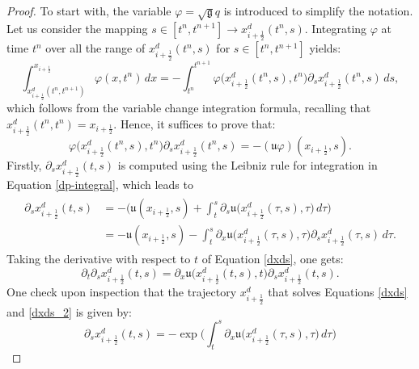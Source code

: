 \documentclass[preprint,12pt]{elsarticle}
\begin{document}
\begin{linenumbers}
\begin{proof}
To start with, the variable $\varphi = \sqrt{\mathfrak{g}}q$ is introduced to simplify the notation.
Let us consider the mapping $s\in[t^n,t^{n+1}] \to  x_{i+\frac{1}{2}}^d(t^n,s)$. 
Integrating $\varphi$ at time $t^n$ over all the range of $x_{i+\frac{1}{2}}^d(t^n,s)$ for $s\in[t^n,t^{n+1}]$ yields:
\begin{equation}
	\label{depint_1}
	\int_{x_{i+\frac{1}{2}}^d(t^n,t^{n+1})}^{x_{i+\frac{1}{2}}}   
	\varphi(x,t^n)\,dx 
	= -\int_{t^n}^{t^{n+1}}  \varphi\big( x_{i+\frac{1}{2}}^d(t^n,s),t^n\big){\partial_s}{ x_{i+\frac{1}{2}}^d} (t^n,s)\,ds,
\end{equation}
which follows from the variable change integration formula, recalling that ${ x_{i+\frac{1}{2}}^d(t^n,t^{n}) = x_{i+\frac{1}{2}}}$. 
Hence, it suffices to prove that:
\begin{equation}
	\label{phi-u}
	\varphi\big( x_{i+\frac{1}{2}}^d(t^n,s),t^n\big){\partial_s}{ x_{i+\frac{1}{2}}^d} (t^n,s) = -(\mathfrak{u}\varphi)(x_{i+\frac{1}{2}},s).
\end{equation}
Firstly, ${\partial_s x_{i+\frac{1}{2}}^d}(t,s)$ is computed using the Leibniz rule for integration in Equation \eqref{dp-integral}, which leads to
\begin{align}
	\begin{split}
		\label{dxds}
		{\partial_s x_{i+\frac{1}{2}}^d} (t,s) &= - \bigg(\mathfrak{u}(x_{i+\frac{1}{2}},s) + 
		\int_{t}^{s} {\partial_s\mathfrak{u}}\big( x_{i+\frac{1}{2}}^d(\tau,s),\tau\big) \,d\tau \bigg)\\
		&=- \mathfrak{u}(x_{i+\frac{1}{2}},s) -
		\int_{t}^{s} {\partial_x}{\mathfrak{u}}\big( x_{i+\frac{1}{2}}^d(\tau, s),\tau\big) 
		{\partial_s  x_{i+\frac{1}{2}}^d}(\tau, s)\,d\tau.
	\end{split}
\end{align}
Taking the derivative with respect to $t$ of Equation \eqref{dxds}, one gets:
\begin{equation}
	\label{dxds_2}
	{\partial_t }{\partial_s  x_{i+\frac{1}{2}}^d}
	(t,s) = {\partial_x}{\mathfrak{u}}\big(x_{i+\frac{1}{2}}^d(t, s), t\big) 
	{\partial _s} x_{i+\frac{1}{2}}^d (t, s).
\end{equation}
One check upon inspection that the trajectory $x_{i+\frac{1}{2}}^d$ that solves Equations \eqref{dxds} and \eqref{dxds_2} is given by:
\begin{equation}
	\label{xs_int}
	{\partial_s  x_{i+\frac{1}{2}}^d}(t,s) = -
	\exp{\bigg(\int_{t}^{s} {\partial_x}{\mathfrak{u}}\big( x_{i+\frac{1}{2}}^d(\tau,s),\tau\big)  \,d\tau \bigg)}

\end{equation}
\end{proof}
\end{linenumbers}
\end{document}
